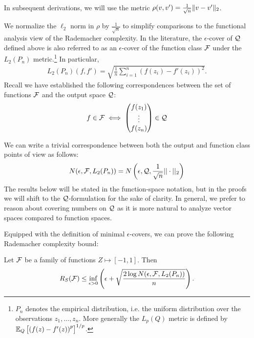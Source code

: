 In subsequent derivations, we will use the metric $\rho(v,v') = \frac 1 {\sqrt{n}} \|v-v'\|_2$. 

\begin{remark}
We normalize the $\ell_2$ norm in $\rho$ by $\frac{1}{\sqrt{n}}$ to simplify comparisons to the functional analysis view of the Rademacher complexity. In the literature, the $\epsilon$-cover of $\mathcal Q$ defined above is also referred to as an $\epsilon$-cover of the function class $\mathcal F$ under the $L_2(P_n)$ metric.\footnote{$P_n$ denotes the empirical distribution, i.e. the uniform distribution over the observations $z_1,\dots,z_n$. More generally the $L_p(Q)$ metric is defined by $\operatorname*{\mathbb{E}}_Q \left [\left (f(z) - f'(z) \right )^p \right]^{1/p}$.}
In particular, 
\begin{align}
L_2(P_n)(f,f') = \sqrt{ \frac 1 n \sum_{i=1}^n (f(z_i) - f'(z_i))^2 }.
\end{align}
Recall we have established the following correspondences between the set of functions $\mathcal F$ and the output space $\mathcal Q$:
\begin{align}
    f \in \mathcal F \iff \begin{pmatrix} f(z_1) \\ \vdots \\ f(z_n) \end{pmatrix} \in \mathcal Q
\end{align}

We can write a trivial correspondence between both the output and function class points of view as follows:
\begin{align}
N(\epsilon, \mathcal F, L_2(P_n)) = N\left (\epsilon, \mathcal Q, \frac{1}{\sqrt{n}} || \cdot ||_2 \right )
\end{align}
The results below will be stated in the function-space notation, but in the proofs we will shift to the $\mathcal Q$-formulation for the sake of clarity.
In general, we prefer to reason about covering numbers on $\mathcal Q$ as it is more natural to analyze vector spaces compared to function spaces.
\label{lec8:rmk:l2pncover}
\end{remark}

Equipped with the definition of minimal $\epsilon$-covers, we can prove the following Rademacher complexity bound:

\begin{theorem}\label{lec8:thm:rc-covering-bd}
Let $\mathcal F$ be a family of functions $Z \mapsto [-1,1]$. Then
\begin{equation}
R_S(\mathcal F) \le \inf_{\epsilon > 0} \left( \epsilon + \sqrt{ \frac {2\log N(\epsilon, \mathcal F, L_2(P_n))} n } \right). \label{lec8:eqn:rc-covering-bd}
\end{equation}
\end{theorem}

